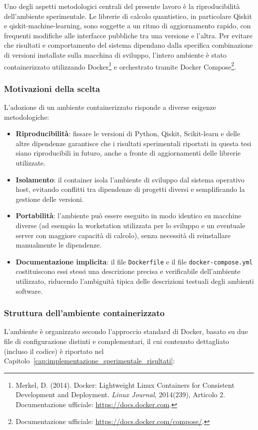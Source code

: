 Uno degli aspetti metodologici centrali del presente lavoro è la riproducibilità dell'ambiente sperimentale. Le librerie di calcolo quantistico, in particolare Qiskit e qiskit-machine-learning, sono soggette a un ritmo di aggiornamento rapido, con frequenti modifiche alle interfacce pubbliche tra una versione e l'altra. Per evitare che risultati e comportamento del sistema dipendano dalla specifica combinazione di versioni installate sulla macchina di sviluppo, l'intero ambiente è stato containerizzato utilizzando Docker\footnote{Merkel, D. (2014). Docker: Lightweight Linux Containers for Consistent Development and Deployment. \textit{Linux Journal}, 2014(239), Articolo 2. Documentazione ufficiale: \url{https://docs.docker.com}.} e orchestrato tramite Docker Compose\footnote{Documentazione ufficiale: \url{https://docs.docker.com/compose/}.}.

\subsubsection{Motivazioni della scelta}
L'adozione di un ambiente containerizzato risponde a diverse esigenze metodologiche:
\begin{itemize}
    \item \textbf{Riproducibilità}: fissare le versioni di Python, Qiskit, Scikit-learn e delle altre dipendenze garantisce che i risultati sperimentali riportati in questa tesi siano riproducibili in futuro, anche a fronte di aggiornamenti delle librerie utilizzate.
    \item \textbf{Isolamento}: il container isola l'ambiente di sviluppo dal sistema operativo host, evitando conflitti tra dipendenze di progetti diversi e semplificando la gestione delle versioni.
    \item \textbf{Portabilità}: l'ambiente può essere eseguito in modo identico su macchine diverse (ad esempio la workstation utilizzata per lo sviluppo e un eventuale server con maggiore capacità di calcolo), senza necessità di reinstallare manualmente le dipendenze.
    \item \textbf{Documentazione implicita}: il file \texttt{Dockerfile} e il file \texttt{docker-compose.yml} costituiscono essi stessi una descrizione precisa e verificabile dell'ambiente utilizzato, riducendo l'ambiguità tipica delle descrizioni testuali degli ambienti software.
\end{itemize}

\subsubsection{Struttura dell'ambiente containerizzato}
L'ambiente è organizzato secondo l'approccio standard di Docker, basato su due file di configurazione distinti e complementari, il cui contenuto dettagliato (incluso il codice) è riportato nel Capitolo~\ref{cap:implementazione_sperimentale_risultati}:

